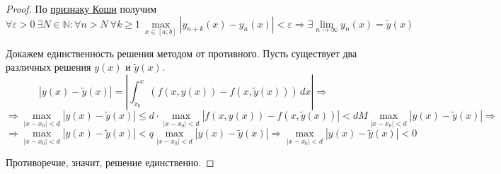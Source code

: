 \begin{proof}
По \hyperref[th:Cauchy_criterion]{признаку Коши} получим
\begin{equation*}
\forall \varepsilon > 0 \ \exists N \in \mathbb N \colon \forall n > N \ \forall k \geqslant 1 \
\max_{x \in [a; b]} |y_{n+k}(x) - y_n(x)| < \varepsilon \Rightarrow
\exists \lim_{n \to \infty} y_n(x) = \tilde y(x)
\end{equation*}

Докажем единственность решения методом от противного.
Пусть существует два различных решения $y(x)$ и $\tilde y(x)$.
\begin{equation*}
|y(x) - \tilde y(x)| =
\left| \int_{x_0}^x (f(x, y(x)) - f(x, \tilde y(x)))\,dx \right| \Rightarrow
\end{equation*}
\begin{equation*}
\Rightarrow \max_{|x - x_0| < d} |y(x) - \tilde y(x)| \leqslant
d \cdot \max_{|x - x_0| < d} |f(x, y(x)) - f(x, \tilde y(x))| <
d M \max_{|x - x_0| < d} |y(x) - \tilde y(x)| \Rightarrow
\end{equation*}
\begin{equation*}
\Rightarrow \max_{|x - x_0| < d} |y(x) - \tilde y(x)| < q \max_{|x - x_0| < d} |y(x) - \tilde y(x)| \Rightarrow
\max_{|x - x_0| < d} |y(x) - \tilde y(x)| < 0
\end{equation*}

Противоречие, значит, решение единственно.
\end{proof}